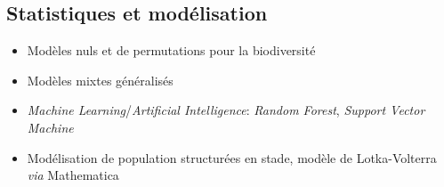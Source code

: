 \documentclass[10pt,a4paper,]{article}
\providecommand{\tightlist}{%
  \setlength{\itemsep}{0pt}\setlength{\parskip}{0pt}}
\begin{document}
\subsection{Statistiques et
modélisation}\label{statistiques-et-moduxe9lisation}

\begin{itemize}
\tightlist
\item
  Modèles nuls et de permutations pour la biodiversité
\item
  Modèles mixtes généralisés
\item
  \emph{Machine Learning}/\emph{Artificial Intelligence}: \emph{Random
  Forest}, \emph{Support Vector Machine}
\item
  Modélisation de population structurées en stade, modèle de
  Lotka-Volterra \emph{via} Mathematica
\end{itemize}
\end{document}
